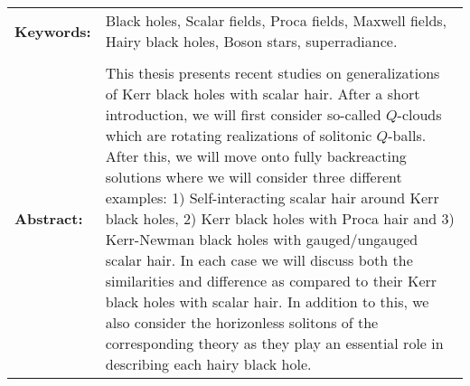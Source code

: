 \begin{tabularx}{\textwidth}{lX}	
%
{\bf Keywords:} & Black holes, Scalar fields, Proca fields, Maxwell fields, Hairy black holes, Boson stars, superradiance.\\
\\
%
{\bf Abstract:} & 
This thesis presents recent studies on generalizations of Kerr black holes with scalar hair.
After a short introduction, we will first consider so-called $Q$-clouds which are rotating realizations of solitonic $Q$-balls.
After this, we will move onto fully backreacting solutions where we will consider three different examples: 1) Self-interacting scalar hair around Kerr black holes, 2) Kerr black holes with Proca hair and 3) Kerr-Newman black holes with gauged/ungauged scalar hair.
In each case we will discuss both the similarities and difference as compared to their Kerr black holes with scalar hair.
In addition to this, we also consider the horizonless solitons of the corresponding theory as they play an essential role in describing each hairy black hole.
%
\end{tabularx}

